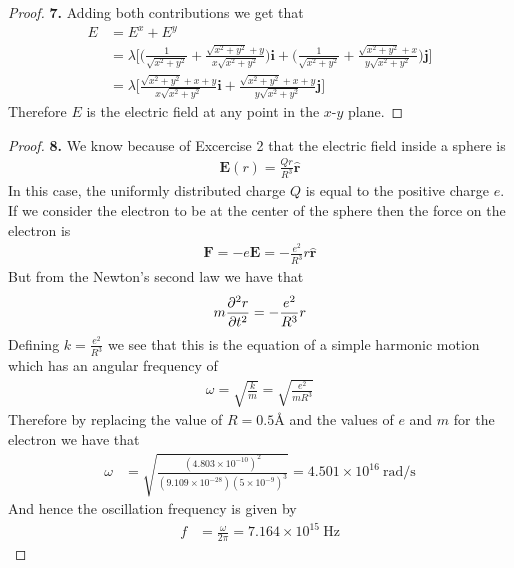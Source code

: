 \documentclass[11pt]{article}
\newcommand{\uvi}{\bm{i}}
\newcommand{\uvj}{\bm{j}}
\newcommand{\hatr}{\bm{\hat{r}}}
\theoremstyle{definition}
\begin{document}
\begin{proof}{\textbf{7.}}
    Adding both contributions we get that
    \begin{align*}
        E &= E^x + E^y\\
        &= \lambda\bigg[
        \bigg(\frac{1}{\sqrt{x^2 + y^2}}
        + \frac{\sqrt{x^2 + y^2} + y}{x\sqrt{x^2 + y^2}}\bigg)\uvi
            + \bigg(\frac{1}{\sqrt{x^2 + y^2}}
            + \frac{\sqrt{x^2 + y^2} + x}{y\sqrt{x^2 + y^2}}\bigg)\uvj
        \bigg]\\
        &= \lambda\bigg[
            \frac{\sqrt{x^2 + y^2} + x + y}{x\sqrt{x^2 + y^2}}\uvi
            + \frac{\sqrt{x^2 + y^2} + x + y}{y\sqrt{x^2 + y^2}}\uvj
        \bigg]
    \end{align*}
    Therefore $E$ is the electric field at any point in the $x$-$y$ plane.
\end{proof}
\cleardoublepage
\begin{proof}{\textbf{8.}}
    We know because of Excercise 2 that the electric field inside a sphere is
    \begin{align*}
        \bm{E}(r) = \frac{Qr}{R^3}\hatr
    \end{align*}
    In this case, the uniformly distributed charge $Q$ is equal to
    the positive charge $e$. If we consider the electron to be at the center
    of the sphere then the force on the electron is
    \begin{align*}
        \bm{F} = -e \bm{E} = -\frac{e^2}{R^3}r\hatr
    \end{align*}
    But from the Newton's second law we have that
    \begin{align*}
        m\partialderivative[2]{r}{t} = -\frac{e^2}{R^3} r
    \end{align*}
    Defining $k = \frac{e^2}{R^3}$ we see that this is the equation of 
    a simple harmonic motion which has an angular frequency of
    \begin{align*}
        \omega = \sqrt{\frac{k}{m}} = \sqrt{\frac{e^2}{mR^3}}
    \end{align*}
    Therefore by replacing the value of $R = 0.5$\r{A} and the values of $e$
    and $m$ for the electron we have that
    \begin{align*}
        \omega &=
        \sqrt{\frac{(4.803\times 10^{-10})^2}
        {(9.109\times 10^{-28})(5\times 10^{-9})^3}}
        = 4.501 \times 10^{16}~\text{rad/s}
    \end{align*}
    And hence the oscillation frequency is given by
    \begin{align*}
        f &= \frac{\omega}{2\pi} = 7.164 \times 10^{15}~\text{Hz}
    \end{align*}
\end{proof}
\end{document}
